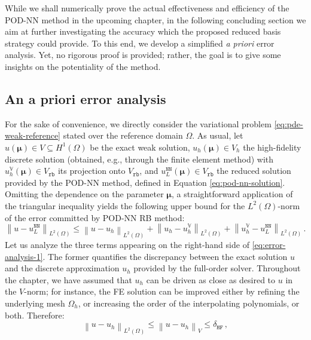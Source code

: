 \documentclass[12pt, a4paper, twoside, openright]{report}
\numberwithin{equation}{chapter}
\theoremstyle{theorem}
\theoremstyle{definition}
\theoremstyle{remark}
\theoremstyle{proposition}
\numberwithin{figure}{chapter}
\newcommand{\norm}[1]{\left\lVert#1\right\rVert}
\newcommand{\bg}[1]{\boldsymbol{#1}}
\begin{document}
		\algrenewcommand\textproc{\textsc}
		
		While we shall numerically prove the actual effectiveness and efficiency of the POD-NN method in the upcoming chapter, in the following concluding section we aim at further investigating the accuracy which the proposed reduced basis strategy could provide. To this end, we develop a simplified \emph{a priori} error analysis. Yet, no rigorous proof is provided; rather, the goal is to give some insights on the potentiality of the method.
		
	\subsection{An a priori error analysis}
	\label{section:An a priori error analysis}
	
		For the sake of convenience, we directly consider the variational problem \eqref{eq:pde-weak-reference} stated over the reference domain $\Omega$. As usual, let $u(\bg{\mu}) \in V \subseteq H^1(\Omega)$ be the exact weak solution, $u_h(\bg{\mu}) \in V_h$ the high-fidelity discrete solution (obtained, e.g., through the finite element method) with $u_h^{\mathbb{V}}(\bg{\mu}) \in V_{\texttt{rb}}$ its projection onto $V_{\texttt{rb}}$, and $u_L^{\texttt{NN}}(\bg{\mu}) \in V_{\texttt{rb}}$ the reduced solution provided by the POD-NN method, defined in Equation \eqref{eq:pod-nn-solution}. Omitting the dependence on the parameter $\bg{\mu}$, a straightforward application of the triangular inequality yields the following upper bound for the $L^2(\Omega)$-norm of the error committed by POD-NN RB method:
		\begin{equation}
			\label{eq:error-analysis-1}
			\norm{u - u_L^{\texttt{NN}}}_{L^2(\Omega)} \leq \norm{u - u_h}_{L^2(\Omega)} + \norm{u_h - u_h^{\mathbb{V}}}_{L^2(\Omega)} + \norm{u_h^{\mathbb{V}} - u_L^{\texttt{NN}}}_{L^2(\Omega)} \, .
		\end{equation}
		Let us analyze the three terms appearing on the right-hand side of \eqref{eq:error-analysis-1}. The former quantifies the discrepancy between the exact solution $u$ and the discrete approximation $u_h$ provided by the full-order solver. Throughout the chapter, we have assumed that $u_h$ can be driven as close as desired to $u$ in the $V$-norm; for instance, the FE solution can be improved either by refining the underlying mesh $\Omega_h$, or increasing the order of the interpolating polynomials, or both. Therefore:
		\begin{equation}
			\label{eq:error-analysis-2}
			\norm{u - u_h}_{L^2(\Omega)} \leq \norm{u - u_h}_V \leq \delta_{\texttt{HF}} \, ,
		\end{equation} 
\end{document}
